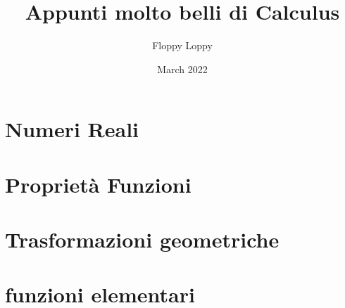 \documentclass[a4paper]{article}
\theoremstyle{definition}
\begin{document}
\title{Appunti molto belli di Calculus}
\author{Floppy Loppy}
\date{March 2022}
\maketitle
\tableofcontents




\newpage
\section{Numeri Reali}\label{sec:introduzione}



\newpage
\section{Proprietà Funzioni}\label{sec:proprietà_funzioni}



\newpage
\section{Trasformazioni geometriche}\label{sec:trasformazioni_gemoetriche}



\section{funzioni elementari}\label{sec:funzioni_elementari}

\end{document}
